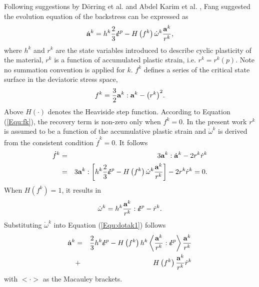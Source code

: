 \documentclass[preprint,5p,twocolumn,11pt,sort&compress]{elsarticle}
\newcommand{\dotbfepsilon}{{\mbox{\boldmath{$\dot\varepsilon$}}}}
\newcommand{\bfa}{{\bf a}}
\begin{document}
Following suggestions by D\"orring et al. \cite{Doerring2003} and Abdel Karim et al. \cite{AbdelKarim20051303}, Fang \cite{fang2015cyclic} suggested the evolution equation of the backstress can be expressed as
\begin{equation}
\label{Equ:dotak1}
{\dot\bfa^k} = {h^k}\frac{2}{3}{\dotbfepsilon^p} - H\left( {{f^k}} \right){\dot \omega ^k}\frac{{{\bfa^k}}}{{{r^k}}},
\end{equation}
where ${{{h}}^k} $ and ${{{r}}^k} $ are the state variables introduced to describe cyclic plasticity of the material, $r^k$ is a function of accumulated plastic strain, i.e. ${r^k} = {r^k}\left( p \right)$.  Note no summation convention is applied for $k$. ${{{f}}^k} $ defines a series of the critical state surface in the deviatoric stress space,
\begin{equation}
\label{Equ:fk}
{f^k} = \frac{3}{2}{\bfa^k}:{\bfa^k} - {\left( {{r^k}} \right)^2}.
\end{equation}
Above  $H(\cdot)$ denotes the Heaviside step function. According to Equation (\ref{Equ:fk}), the recovery term is non-zero only when ${f^k} = 0$. In the present work  $r^k$ is assumed to be a function of the accumulative plastic strain and ${\dot \omega ^k}$ is derived from the consistent condition ${\dot f^k} = 0$. It follows
\begin{eqnarray}
\label{Equ:dotfk}
{\dot f^k} &=& 3{\bfa^k}:{\dot\bfa^k} - 2{r^k}{\dot r^k} \\ \nonumber
&=& 3{\bfa^k}:\left[ {{h^k}\frac{2}{3}{{\dotbfepsilon}^p} - H\left( {{f^k}} \right){{\dot \omega }^k}\frac{{{\bfa^k}}}{{{r^k}}}} \right] - 2{r^k}{\dot r^k} = 0.
\end{eqnarray}
When $H\left( {{f^k}} \right) = 1$, it results in
\begin{equation}
\label{Equ:dotomegak}
{\dot \omega ^k} = {h^k}\frac{{{\bfa^k}}}{{{r^k}}}:{\dotbfepsilon^p} - {\dot r^k}.
\end{equation}
Substituting ${\dot \omega ^k}$ into Equation (\ref{Equ:dotak1}) follows
\begin{eqnarray}
\label{Equ:dotak2}\nonumber
{\dot\bfa^k} &=& \frac{2}{3}{h^k}{\dotbfepsilon^p} - H\left( {{f^k}} \right){h^k}\left\langle {\frac{{{\bfa^k}}}{{{r^k}}}:{{\dotbfepsilon}^p}} \right\rangle \frac{{{\bfa^k}}}{{{r^k}}} \\
&+& H\left( {{f^k}} \right)\frac{{{\bfa^k}}}{{{r^k}}}{\dot r^k}
\end{eqnarray}
with $<\cdot>$ as the Macauley brackets.
\end{document}
